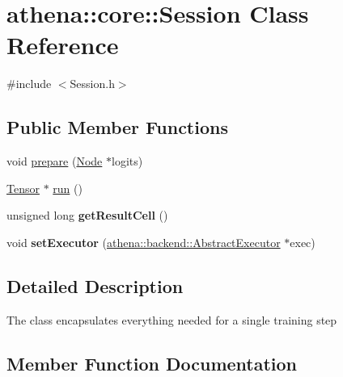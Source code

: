 \hypertarget{classathena_1_1core_1_1_session}{}\section{athena\+:\+:core\+:\+:Session Class Reference}
\label{classathena_1_1core_1_1_session}


{\ttfamily \#include $<$Session.\+h$>$}

\subsection*{Public Member Functions}
\begin{DoxyCompactItemize}
\item 
void \mbox{\hyperlink{classathena_1_1core_1_1_session_a28b51416420aca2c39d9cf7ee81fe41d}{prepare}} (\mbox{\hyperlink{classathena_1_1core_1_1_node}{Node}} $\ast$logits)
\item 
\mbox{\hyperlink{classathena_1_1core_1_1_tensor}{Tensor}} $\ast$ \mbox{\hyperlink{classathena_1_1core_1_1_session_ab08af50ae0bbd2ed5171e1f45a7680ff}{run}} ()
\item 
\mbox{\label{classathena_1_1core_1_1_session_a560fda7749519c69a5cafd889fd4077c}} 
unsigned long {\bfseries get\+Result\+Cell} ()
\item 
\mbox{\label{classathena_1_1core_1_1_session_a8aaab4641be2fe06e2ae098c366375e8}} 
void {\bfseries set\+Executor} (\mbox{\hyperlink{classathena_1_1backend_1_1_abstract_executor}{athena\+::backend\+::\+Abstract\+Executor}} $\ast$exec)
\end{DoxyCompactItemize}


\subsection{Detailed Description}
The class encapsulates everything needed for a single training step 

\subsection{Member Function Documentation}
\mbox{\label{classathena_1_1core_1_1_session_a28b51416420aca2c39d9cf7ee81fe41d}} 
